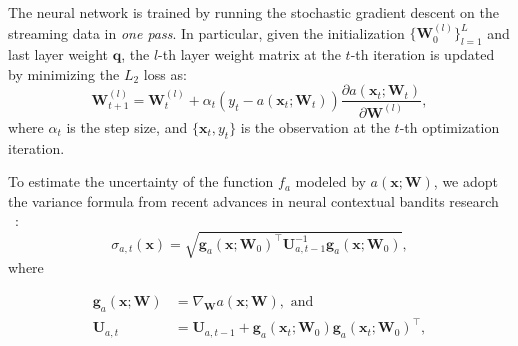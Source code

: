 The neural network is trained by running the stochastic gradient descent on the streaming data in \textit{one pass}. In particular, given the initialization $\{\mathbf{W}_0^{(l)} \}_{l=1}^L$ and last layer weight $\mathbf{q}$, the $l$-th layer weight matrix at the $t$-th iteration is updated by minimizing the $L_2$ loss as:
\begin{equation}
    \label{eqn:neural-cbo_train_NN}
    \mathbf{W}_{t+1}^{(l)} = \mathbf{W}_{t}^{(l)} + \alpha_t (y_t - a(\mathbf{x}_t; \mathbf{W}_t)) \frac{\partial a(\mathbf{x}_t; \mathbf{W}_t)}{\partial \mathbf{W}^{(l)}},
\end{equation}
where $\alpha_t$ is the step size, and $\{\mathbf{x}_t, y_t\}$ is the observation at the $t$-th optimization iteration. 



To estimate the uncertainty of the function $f_a$ modeled by $a(\mathbf{x}; \mathbf{W})$, we adopt the variance formula from recent advances in neural contextual bandits research ~\citep{zhou2020neural, kassraie2022neural}:
\begin{equation}
    \label{Eqn:neural_cbo_variance_formula}
    \sigma_{a,t}(\mathbf{x}) = \sqrt{\mathbf{g}_{a}(\mathbf{x}; \mathbf{W}_0)^\top \mathbf{U}_{a, t-1}^{-1} \mathbf{g}_{a}(\mathbf{x}; \mathbf{W}_0)},
\end{equation}
where

\begin{equation}
\label{eqn:neural-cbo_ntk_cov}
\begin{aligned}
    \mathbf{g}_{a}(\mathbf{x}; \mathbf{W}) &= \nabla_{\mathbf{W}}a(\mathbf{x}; \mathbf{W}), \text{ and}\\
     \mathbf{U}_{a, t} &= \mathbf{U}_{a, t-1} + \mathbf{g}_{a}(\mathbf{x}_t; \mathbf{W}_0) \mathbf{g}_{a}(\mathbf{x}_t; \mathbf{W}_0)^\top,
\end{aligned}
\end{equation}

